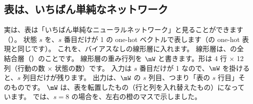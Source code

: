 \subsection*{表は、いちばん単純なネットワーク}

実は、表は「いちばん単純なニューラルネットワーク」と見ることができます（）。
状態 $s$ を、$s$ 番目だけが 1 の one-hot ベクトルで表します（の one-hot 表現と同じです）。
これを、バイアスなしの線形層に入れます。
線形層は、の全結合層（）のことです。
線形層の重み行列を $\mW$ と書きます。形は 4 行 $\times$ 12 列（行動の数 $\times$ 状態の数）です。
入力は $s$ 番目だけが 1 なので、$\mW$ を掛けると、$s$ 列目だけが残ります。
出力は、$\mW$ の $s$ 列目、つまり「表の $s$ 行目」そのものです。
$\mW$ は、表を転置したもの（行と列を入れ替えたもの）になっています。
では、$s=8$ の場合を、左右の橙のマスで示しました。

